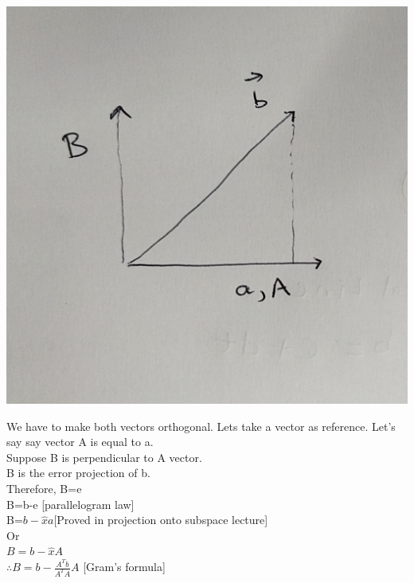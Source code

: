 \documentclass[]{article}
\begin{document}
\vspace{12pt}
\begin{center}
\includegraphics[scale=.25]{gram1}
\end{center}
\vspace{10pt}

\noindent
We have to make both vectors orthogonal. Lets take a vector as reference. Let's say say vector A is equal to a.\\


\noindent
Suppose B is perpendicular to A vector.\\

\noindent
B is the error projection of b.\\
Therefore, B=e\\

\noindent
B=b-e [parallelogram law]\\

\noindent
B=$b-\hat{x}a$[Proved in projection onto subspace lecture]\\
Or\\
$B=b-\hat{x}A$\\

\noindent
$\therefore B=b-\frac{A^Tb}{A^TA}A$ [Gram's formula] \\

\vspace{10pt}
\end{document}
